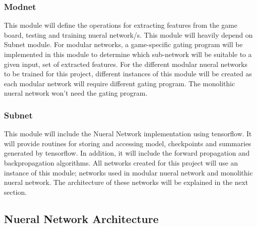 \documentclass[12pt,a4paper]{article}
\begin{document}
\subsubsection{Modnet}
This module will define the operations for extracting features from the game board, testing and training nueral network/s. This module will heavily depend on Subnet module. For modular networks, a game-specific gating program will be implemented in this module to determine which sub-network will be suitable to a given input, set of extracted features. For the different modular nueral networks to be trained for this project, different instances of this module will be created as each modular network will require different gating program. The monolithic nueral network won't need the gating program.

\subsubsection{Subnet}
This module will include the Nueral Network implementation using tensorflow. It will provide routines for storing and accessing model, checkpoints and summaries generated by tensorflow. In addition, it will include the forward propagation and backpropagation algorithms. All networks created for this project will use an instance of this module; networks used in modular nueral network and monolithic nueral network. The architecture of these networks will be explained in the next section.

\subsection{Nueral Network Architecture} \label{modnet}
\end{document}
